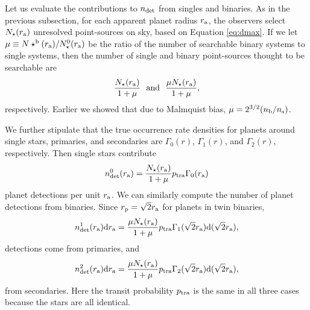 \documentclass[12pt,modern]{aastex61}
\renewcommand{\a}{_{\rm a}}
\newcommand{\s}{_{\rm s}}
\newcommand{\p}{_{\rm p}}
\renewcommand{\b}{_{\rm b}}
\begin{document}
Let us evaluate the contributions to $n_{\rm det}$ from singles and
binaries.  As in the previous subsection, for each apparent planet
radius $r\a$, the observers select $N_\star(r\a)$ unresolved
point-sources on sky, based on Equation \ref{eq:dmax}.  If we let $\mu
\equiv N\star^{\rm b}(r\a)/N_\star^0(r\a)$ be the ratio of the number
of searchable binary systems to single systems, then the number of
single and binary point-sources thought to be searchable are
\begin{equation}
  \frac{N_\star(r\a)}{1+\mu}~~{\rm and}~~\frac{\mu N_\star(r\a)}{1+\mu},
\end{equation}
respectively.  Earlier we showed that due to Malmquist bias, $\mu =
2^{3/2}(n\b/n\s)$.

We further stipulate that the true occurrence rate densities for
planets around single stars, primaries, and secondaries are
$\Gamma_0(r)$, $\Gamma_1(r)$, and $\Gamma_2(r)$, respectively.  
Then single stars contribute
\begin{equation}
  n_{\rm det}^0(r\a) = 
    {N_\star(r\a) \over {1+\mu}} p_{\rm tra} \Gamma_0(r\a)
  \label{eq:n0}
\end{equation}
planet detections per unit $r\a$.  We can similarly compute the number
of planet detections from binaries.  Since $r\p=\sqrt{2}r\a$ for
planets in twin binaries, 
\begin{equation}
  n_{\rm det}^1(r\a)\mathrm{d}r\a =
      {\mu N_\star(r\a) \over {1+\mu}} p_{\rm tra}
      \Gamma_1(\sqrt{2}r\a)\mathrm{d}(\sqrt{2}r\a),
	\label{eq:n1}
\end{equation}
detections come from primaries, and
\begin{equation}
  n_{\rm det}^2(r\a)\mathrm{d}r\a =
      {\mu N_\star(r\a) \over {1+\mu}} p_{\rm tra}
      \Gamma_2(\sqrt{2}r\a)\mathrm{d}(\sqrt{2}r\a),
	\label{eq:n2}
\end{equation}
from secondaries.  Here the transit probability $p_{\rm tra}$ is the
same in all three cases because the stars are all identical. 
\end{document}
